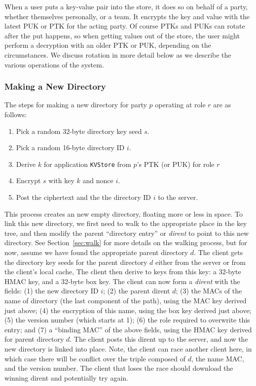 When a user puts a key-value pair into the store, it does so on behalf of a party,
whether themselves personally, or a team. It encrypts the key and value with the latest
PUK or PTK for the acting party. Of course PTKs and PUKs can rotate after the put
happens, so when getting values out of the store, the user might perform a decryption
with an older PTK or PUK, depending on the circumstances. We discuss rotation in
more detail below as we describe the various operations of the system.

\subsubsection{Making a New Directory}

The steps for making a new directory for party $p$ operating at role $r$ are as follows:

\begin{enumerate}
    \item Pick a random 32-byte directory key seed $s$.
    \item Pick a random 16-byte directory ID $i$.
    \item Derive $k$ for application \texttt{KVStore} from $p$'s PTK (or PUK) for role $r$
    \item Encrypt $s$ with key $k$ and nonce $i$.
    \item Post the ciphertext and the the directory ID $i$ to the server.
\end{enumerate}
%
This process creates an new empty directory, floating more or less in space. To link this 
new directory, we first need to walk to the appropriate place in the key tree, and then
modify the parent ``directory entry'' or \textit{dirent} to point to this new directory.
See Section~\ref{sec:walk} for more details on the walking process, but for now, assume
we have found the appropriate parent directory $d$. The client gets the directory key
seeds for the parent directory $d$ either from the server or from the client's local cache,
The client then derive to keys from this key: a 32-byte HMAC key, and a 32-byte box key.
The client can now form a \textit{dirent} with the fields: (1) the new directory ID $i$; (2)
the parent dirent $d$; (3) the MACs of the name of directory (the last component of the path),
using the MAC key derived just above; (4) the encryption of this name, using the box key
derived just above; (5) the version number (which starts at 1); (6) the role required to
overwrite this entry; and (7) a ``binding MAC'' of the above fields, using the HMAC
key derived for parent directory $d$. The client posts this dirent up to the server, and now
the new directory is linked into place. Note, the client can race another client here,
in which case there will be conflict over the triple composed of $d$, the name MAC, and 
the version number. The client that loses the race should download the winning dirent
and potentially try again.

